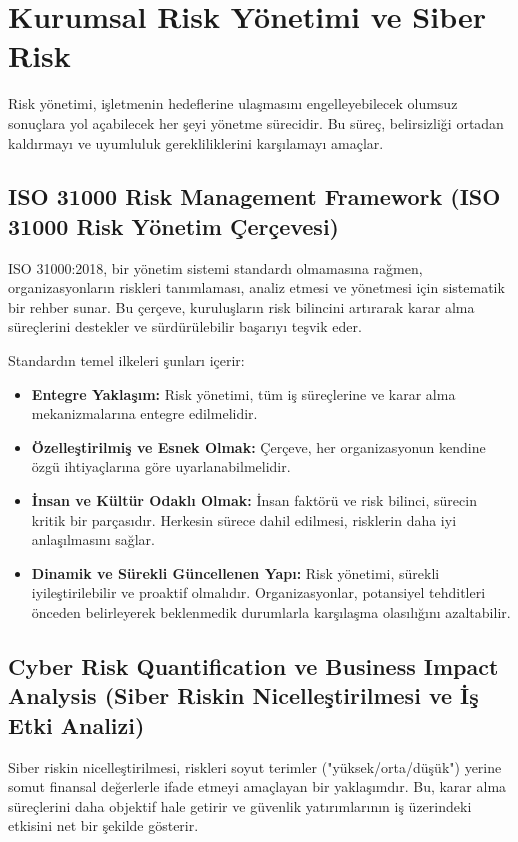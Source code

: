 \section{Kurumsal Risk Yönetimi ve Siber Risk}

Risk yönetimi, işletmenin hedeflerine ulaşmasını engelleyebilecek olumsuz sonuçlara yol açabilecek her şeyi yönetme sürecidir. Bu süreç, belirsizliği ortadan kaldırmayı ve uyumluluk gerekliliklerini karşılamayı amaçlar.

\subsection{ISO 31000 Risk Management Framework (ISO 31000 Risk Yönetim Çerçevesi)}

ISO 31000:2018, bir yönetim sistemi standardı olmamasına rağmen, organizasyonların riskleri tanımlaması, analiz etmesi ve yönetmesi için sistematik bir rehber sunar. Bu çerçeve, kuruluşların risk bilincini artırarak karar alma süreçlerini destekler ve sürdürülebilir başarıyı teşvik eder.

Standardın temel ilkeleri şunları içerir:
\begin{itemize}
    \item \textbf{Entegre Yaklaşım:} Risk yönetimi, tüm iş süreçlerine ve karar alma mekanizmalarına entegre edilmelidir.
    \item \textbf{Özelleştirilmiş ve Esnek Olmak:} Çerçeve, her organizasyonun kendine özgü ihtiyaçlarına göre uyarlanabilmelidir.
    \item \textbf{İnsan ve Kültür Odaklı Olmak:} İnsan faktörü ve risk bilinci, sürecin kritik bir parçasıdır. Herkesin sürece dahil edilmesi, risklerin daha iyi anlaşılmasını sağlar.
    \item \textbf{Dinamik ve Sürekli Güncellenen Yapı:} Risk yönetimi, sürekli iyileştirilebilir ve proaktif olmalıdır. Organizasyonlar, potansiyel tehditleri önceden belirleyerek beklenmedik durumlarla karşılaşma olasılığını azaltabilir.
\end{itemize}

\subsection{Cyber Risk Quantification ve Business Impact Analysis (Siber Riskin Nicelleştirilmesi ve İş Etki Analizi)}

Siber riskin nicelleştirilmesi, riskleri soyut terimler ("yüksek/orta/düşük") yerine somut finansal değerlerle ifade etmeyi amaçlayan bir yaklaşımdır. Bu, karar alma süreçlerini daha objektif hale getirir ve güvenlik yatırımlarının iş üzerindeki etkisini net bir şekilde gösterir.

